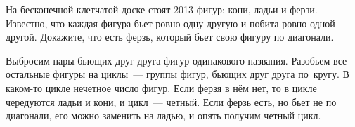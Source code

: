 \problem
На бесконечной клетчатой доске стоят 2013 фигур: кони, ладьи и ферзи.
Известно, что каждая фигура бьет ровно одну другую и побита ровно одной другой.
Докажите, что есть ферзь, который бьет свою фигуру по диагонали.

\solution
Выбросим пары бьющих друг друга фигур одинакового названия.
Разобьем все остальные фигуры на циклы~--- группы фигур, бьющих друг друга
по~кругу.
В каком-то цикле нечетное число фигур.
Если ферзя в нём нет, то в цикле чередуются ладьи и кони, и цикл~--- четный.
Если ферзь есть, но бьет не по диагонали, его можно заменить на ладью, и опять
получим четный цикл. 
\endproblem
